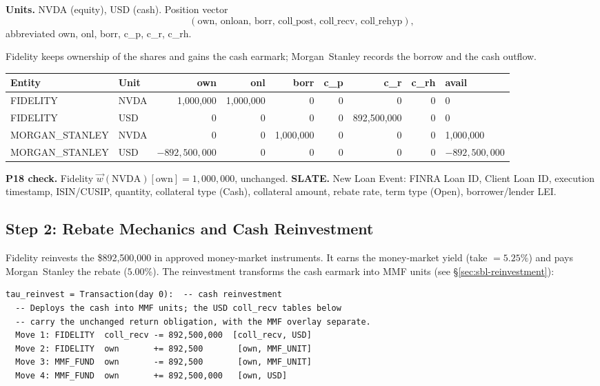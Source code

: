 \noindent\textbf{Units.} NVDA (equity), USD (cash). Position vector
\[(\mathrm{own},\,\mathrm{onloan},\,\mathrm{borr},\,\mathrm{coll\_post},\,\mathrm{coll\_recv},\,\mathrm{coll\_rehyp}),\]
abbreviated own, onl, borr, c\_p, c\_r, c\_rh.

\noindent Fidelity keeps ownership of the shares and gains the cash earmark; Morgan~Stanley records the borrow and the cash outflow.

\begin{center}\footnotesize\setlength{\tabcolsep}{4pt}
\begin{tabular}{l l r r r r r r l}
\toprule
\textbf{Entity} & \textbf{Unit} & own & onl & borr & c\_p & c\_r & c\_rh & avail \\
\midrule
FIDELITY & NVDA & 1{,}000{,}000 & 1{,}000{,}000 & 0 & 0 & 0 & 0 & 0 \\
FIDELITY & USD & 0 & 0 & 0 & 0 & 892{,}500{,}000 & 0 & 0 \\
\midrule
MORGAN\_STANLEY & NVDA & 0 & 0 & 1{,}000{,}000 & 0 & 0 & 0 & 1{,}000{,}000 \\
MORGAN\_STANLEY & USD & $-892{,}500{,}000$ & 0 & 0 & 0 & 0 & 0 & $-892{,}500{,}000$ \\
\bottomrule
\end{tabular}
\end{center}

\noindent\textbf{P18 check.} Fidelity $\vec{w}(\text{NVDA})[\mathrm{own}] = 1{,}000{,}000$, unchanged. \checkmark\quad
\textbf{SLATE.} New Loan Event: FINRA Loan ID, Client Loan ID, execution timestamp, ISIN/CUSIP, quantity, collateral type (Cash), collateral amount, rebate rate, term type (Open), borrower/lender LEI.

\subsection{Step 2: Rebate Mechanics and Cash Reinvestment}
\label{sec:us-step2}

Fidelity reinvests the \$892{,}500{,}000 in approved money-market instruments. It earns the money-market yield (take $= 5.25\%$) and pays Morgan~Stanley the rebate ($5.00\%$). The reinvestment transforms the cash earmark into MMF units (see \S\ref{sec:sbl-reinvestment}):

\begin{lstlisting}
tau_reinvest = Transaction(day 0):  -- cash reinvestment
  -- Deploys the cash into MMF units; the USD coll_recv tables below
  -- carry the unchanged return obligation, with the MMF overlay separate.
  Move 1: FIDELITY  coll_recv -= 892,500,000  [coll_recv, USD]
  Move 2: FIDELITY  own       += 892,500       [own, MMF_UNIT]
  Move 3: MMF_FUND  own       -= 892,500       [own, MMF_UNIT]
  Move 4: MMF_FUND  own       += 892,500,000   [own, USD]
\end{lstlisting}


